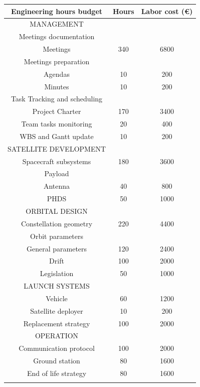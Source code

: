 \begin{longtable}{ccc}
\toprule
\rowcolor[gray]{0.65}
    \textbf{Engineering hours budget} & \textbf{Hours} & \textbf{Labor cost (\euro)} \\
    \midrule
    \endhead
\hline
\rowcolor[gray]{0.85}
	MANAGEMENT &  &  \\ \hline
	Meetings documentation &  &  \\ \hline
	Meetings & 340 & 6800 \\ \hline
	Meetings preparation &  &  \\ \hline
	Agendas & 10 & 200 \\ \hline
	Minutes & 10 & 200 \\ \hline
	Task Tracking and scheduling &  &  \\ \hline
	Project Charter & 170 & 3400 \\ \hline
	Team tasks monitoring & 20 & 400 \\ \hline
	WBS and Gantt update & 10 & 200 \\ \hline
	\rowcolor[gray]{0.85}
	SATELLITE DEVELOPMENT &  &  \\ \hline
	Spacecraft subsystems & 180 & 3600 \\ \hline
	Payload &  &  \\ \hline
	Antenna & 40 & 800 \\ \hline
	PHDS & 50 & 1000 \\ \hline
	\rowcolor[gray]{0.85}
	ORBITAL DESIGN &  &  \\ \hline
	Constellation geometry & 220 & 4400 \\ \hline
	Orbit parameters &  &  \\ \hline
	General parameters & 120 & 2400 \\ \hline
	Drift & 100 & 2000 \\ \hline
	Legislation & 50 & 1000 \\ \hline
	\rowcolor[gray]{0.85}
	LAUNCH SYSTEMS &  &  \\ \hline
	Vehicle & 60 & 1200 \\ \hline
	Satellite deployer & 10 & 200 \\ \hline
	Replacement strategy & 100 & 2000 \\ \hline
	\rowcolor[gray]{0.85}
	OPERATION &  &  \\ \hline
	Communication protocol & 100 & 2000 \\ \hline
	Ground station & 80 & 1600 \\ \hline
	End of life strategy & 80 & 1600 \\ \hline
	\rowcolor[gray]{0.85}

\end{longtable}
